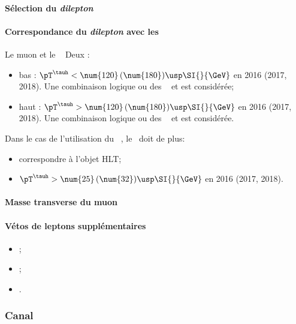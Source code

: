 \paragraph{Sélection du \emph{dilepton}}
\AtLeastOneOSPair{\mu\tauh}
\IfMoreOnePair
\paragraph{Correspondance du \emph{dilepton} avec les \HLTpaths}
Le muon et le \tauh\ \FromPairMatchToHLTObjects{}
Deux \HLTregionsDefined:
\begin{itemize}
    \item bas \pT: $\pT^{\tauh} < \num{120} \, (\num{180}) \usp \SI{}{\GeV}$ en 2016 (2017, 2018).
        Une combinaison logique \og ou \fg{} des \HLTpaths\ \HLTSingleMu{} et \HLTMuTauCross{} est considérée;
    \item haut \pT: $\pT^{\tauh} > \num{120} \, (\num{180}) \usp \SI{}{\GeV}$ en 2016 (2017, 2018).
        Une combinaison logique \og ou \fg{} des \HLTpaths\ \HLTSingleMu{} et \HLTSingleTau{} est considérée.
\end{itemize}
Dans le cas de l'utilisation du \HLTpath\ \HLTMuTauCross{}, le \tauh\ doit de plus:
\begin{itemize}
    \item correspondre à l'objet HLT;
    \item $\pT^{\tauh} > \num{25} \, (\num{32}) \usp \SI{}{\GeV}$ en 2016 (2017, 2018).
\end{itemize}
\paragraph{Masse transverse du muon}
\paragraph{Vétos de leptons supplémentaires}
\LeptonVetoes
\begin{itemize}
    \item \LeptonVetoesSecondMuon;
    \item \LeptonVetoesExtraEle;
    \item \LeptonVetoesMuonPair.
\end{itemize}

\subsubsection{Canal \ele\tauh}\label{chapter-HTT_analysis-section-offline-et}
